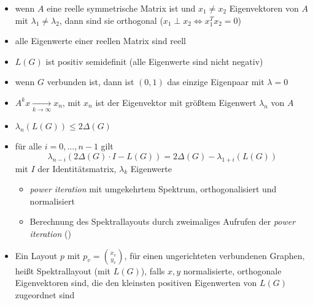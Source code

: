 \begin{itemize}[itemsep=-1pt]
	\item wenn $A$ eine reelle symmetrische Matrix ist und $x_1\neq x_2$ Eigenvektoren von $A$ mit $\lambda_1\neq\lambda_2$, dann sind sie orthogonal ($x_1\perp x_2\Longleftrightarrow x_1^Tx_2=0$)
	\item alle Eigenwerte einer reellen Matrix sind reell
	\item $L(G)$ ist positiv semidefinit (alle Eigenwerte sind nicht negativ)
	\item wenn $G$ verbunden ist, dann ist $(0,1)$ das einzige Eigenpaar mit $\lambda=0$
	\item $A^kx\underset{k\rightarrow \infty}{\longrightarrow} x_n$, mit $x_n$ ist der Eigenvektor mit größtem Eigenwert $\lambda_n$ von $A$
	\item $\lambda_n(L(G))\leq 2\Delta(G)$
	\item für alle $i=0,\dots,n-1$ gilt
		\[\lambda_{n-i}(2\Delta(G)\cdot I-L(G))=2\Delta(G)-\lambda_{1+i}(L(G))\]
		mit $I$ der Identitätsmatrix, $\lambda_k$ Eigenwerte
			\begin{itemize}
				\item \textit{power iteration} mit umgekehrtem Spektrum, orthogonalisiert und normalisiert
				\item Berechnung des Spektrallayouts durch zweimaliges Aufrufen der \textit{power iteration} ()
			\end{itemize}
	\item Ein Layout $p$ mit $p_v={x_v\choose y_v}$, für einen ungerichteten verbundenen Graphen, heißt Spektrallayout (mit $L(G)$), falls $x,y$ normalisierte, orthogonale Eigenvektoren sind, die den kleinsten positiven Eigenwerten von $L(G)$ zugeordnet sind
\end{itemize}

